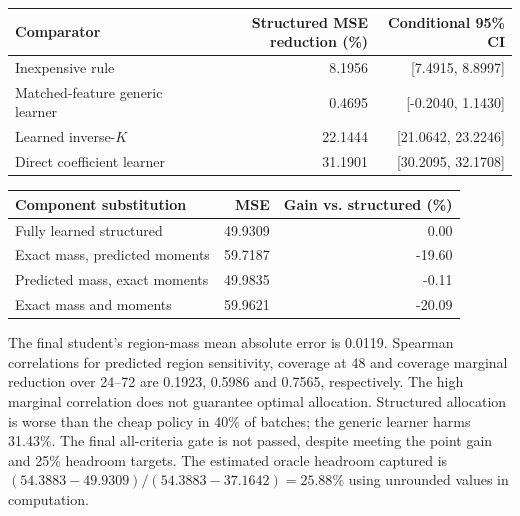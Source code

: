 \documentclass[10pt,letterpaper]{article}
\begin{document}
\begin{center}\begin{minipage}{\linewidth}\centering\small
\begin{tabular}{@{}lrr@{}}\toprule
Comparator & Structured MSE reduction (\%) & Conditional 95\% CI\\\midrule
Inexpensive rule & 8.1956 & [7.4915, 8.8997]\\
Matched-feature generic learner & 0.4695 & [-0.2040, 1.1430]\\
Learned inverse-$K$ & 22.1444 & [21.0642, 23.2246]\\
Direct coefficient learner & 31.1901 & [30.2095, 32.1708]\\\bottomrule
\end{tabular}\end{minipage}\end{center}
\begin{center}\begin{minipage}{\linewidth}\centering\small
\begin{tabular}{@{}lrr@{}}\toprule
Component substitution & MSE & Gain vs. structured (\%)\\\midrule
Fully learned structured & 49.9309 & 0.00\\
Exact mass, predicted moments & 59.7187 & -19.60\\
Predicted mass, exact moments & 49.9835 & -0.11\\
Exact mass and moments & 59.9621 & -20.09\\\bottomrule
\end{tabular}\end{minipage}\end{center}
The final student's region-mass mean absolute error is 0.0119. Spearman correlations for predicted region sensitivity, coverage at 48 and coverage marginal reduction over 24--72 are 0.1923, 0.5986 and 0.7565, respectively. The high marginal correlation does not guarantee optimal allocation. Structured allocation is worse than the cheap policy in 40\% of batches; the generic learner harms 31.43\%. The final all-criteria gate is not passed, despite meeting the point gain and 25\% headroom targets. The estimated oracle headroom captured is $(54.3883-49.9309)/(54.3883-37.1642)=25.88\%$ using unrounded values in computation.
\end{document}
